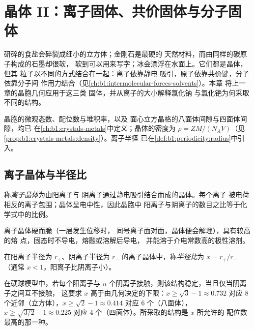 \chapter{晶体 II：离子固体、共价固体与分子固体}\label{ch:b1:crystals-ionic-covalent}

研碎的食盐会碎裂成细小的立方体；金刚石是最硬的
天然材料，而由同样的碳原子构成的石墨却很软，
软到可以用来写字；冰会漂浮在水面上。它们都是晶体，但其
粒子以不同的方式结合在一起：离子依靠静电
吸引，原子依靠共价键，分子依靠分子间
作用力结合（见\cref{ch:b1:intermolecular-forces-solvents}）。本章
将上一章的晶胞几何应用于这三类
固体，并从离子的大小解释氯化钠
与氯化铯为何采取不同的结构。

\begin{recall}
晶胞的微观态数、配位数与堆积率，以及
面心立方晶格的八面体间隙与四面体间隙，均已
在\cref{ch:b1:crystals-metals}中定义；晶体的密度为
$\rho = ZM/(N_A V)$（见\cref{prop:b1:crystals-metals:density}）。离子半径
已在\cref{def:b1:periodicity:radius}中引入。
\end{recall}

\section{离子晶体与半径比}

\begin{definition}[离子晶体]\label{def:b1:crystals-ionic-covalent:ionic-crystal}
称\emph{离子晶体}为由阳离子与
阴离子通过静电吸引结合而成的晶体。每个离子
被电荷相反的离子包围；晶体呈电中性，因此晶胞中
阳离子与阴离子的数目之比等于化学式中的比例。
\end{definition}

\begin{proposition}[离子晶体的性质]\label{prop:b1:crystals-ionic-covalent:ionic-properties}
离子晶体硬而脆（一层发生位移时，
同号离子面对面，晶体便会解理），具有较高的熔
点，固态时不导电，熔融或溶解后导电，
并能溶于介电常数高的极性溶剂。
\end{proposition}
\admitted

\begin{definition}[半径比]\label{def:b1:crystals-ionic-covalent:radius-ratio}
在阳离子半径为 $r_+$、阴离子半径为
$r_-$ 的离子晶体中，称\emph{半径比}为 $x = r_+/r_-$
（通常 $x < 1$，阳离子比阴离子小）。
\end{definition}

\begin{proposition}[半径比规则]\label{prop:b1:crystals-ionic-covalent:rule}
在硬球模型中，若每个阳离子与 $n$
个阴离子接触，则该结构稳定，当且仅当阴离子之间互不接触，
这要求 $x$ 高于由几何决定的下限：$x \ge \sqrt3 - 1
\approx 0.732$ 对应 8 个近邻（立方体），$x \ge \sqrt2 - 1 \approx 0.414$
对应 6 个（八面体），$x \ge \sqrt{3/2} - 1 \approx 0.225$ 对应 4
个（四面体）。所采取的结构是 $x$ 所允许的
配位数最高的那一种。
\end{proposition}

